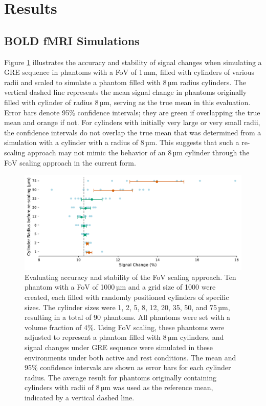 
\section{Results}

\subsection*{BOLD fMRI Simulations}

Figure \ref{fig:uncertainty1} illustrates the accuracy and stability of signal changes when simulating a GRE sequence in phantoms with a FoV of 1\,mm, filled with cylinders of various radii and scaled to simulate a phantom filled with 8\,µm radius cylinders. The vertical dashed line represents the mean signal change in phantoms originally filled with cylinder of radius 8\,µm, serving as the true mean in this evaluation. Error bars denote 95\% confidence intervals; they are green if overlapping the true mean and orange if not. For cylinders with initially very large or very small radii, the confidence intervals do not overlap the true mean that was determined from a simulation with a cylinder with a radius of 8\,µm. This suggests that such a re-scaling approach may not mimic the behavior of an 8\,µm cylinder through the FoV scaling approach in the current form.

\begin{figure}[!htbp]
    \centering
    \includegraphics[width=\textwidth]{fig1_uncertainty1.pdf}
    \caption{Evaluating accuracy and stability of the FoV scaling approach. Ten phantom with a FoV of 1000\,µm and a grid size of 1000 were created, each filled with randomly positioned cylinders of specific sizes. The cylinder sizes were 1, 2, 5, 8, 12, 20, 35, 50, and 75\,µm, resulting in a total of 90 phantoms. All phantoms were set with a volume fraction of 4\%. Using FoV scaling, these phantoms were adjusted to represent a phantom filled with 8\,µm cylinders, and signal changes under GRE sequence were simulated in these environments under both active and rest conditions. The mean and 95\% confidence intervals are shown as error bars for each cylinder radius. The average result for phantoms originally containing cylinders with radii of 8\,µm was used as the reference mean, indicated by a vertical dashed line.}
    \label{fig:uncertainty1}
\end{figure}


